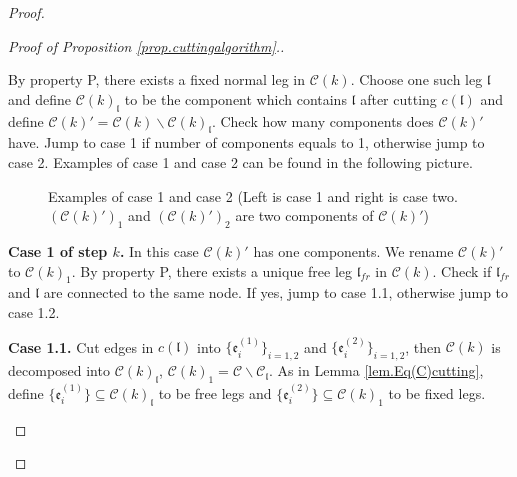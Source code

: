 \begin{proof}
\begin{proof}[Proof of Proposition \ref{prop.cuttingalgorithm}.]
\begin{mdframed}
By property P, there exists a fixed normal leg in $\mathcal{C}(k)$. Choose one such leg $\mathfrak{l}$ and define $\mathcal{C}(k)_{\mathfrak{l}}$ to be the component which contains $\mathfrak{l}$ after cutting $c(\mathfrak{l})$ and define $\mathcal{C}(k)'=\mathcal{C}(k)\backslash \mathcal{C}(k)_{\mathfrak{l}}$. Check how many components does $\mathcal{C}(k)'$ have. Jump to case 1 if number of components equals to 1, otherwise jump to case 2. Examples of case 1 and case 2 can be found in the following picture.
\begin{figure}[H]
    \centering
        \caption{Examples of case 1 and case 2 (Left is case 1 and right is case two. $(\mathcal{C}(k)')_1$ and $(\mathcal{C}(k)')_2$ are two components of $\mathcal{C}(k)'$)}
        \label{fig.step1case}
    \end{figure}

\textbf{Case 1 of step $k$.} In this case $\mathcal{C}(k)'$ has one components. We rename  $\mathcal{C}(k)'$ to $\mathcal{C}(k)_1$. By property P, there exists a unique free leg $\mathfrak{l}_{fr}$ in $\mathcal{C}(k)$. Check if $\mathfrak{l}_{fr}$ and $\mathfrak{l}$ are connected to the same node. If yes, jump to case 1.1, otherwise jump to case 1.2.

\textbf{Case 1.1.} Cut edges in $c(\mathfrak{l})$ into $\{\mathfrak{e}_{i}^{(1)}\}_{i=1,2}$ and $\{\mathfrak{e}_{i}^{(2)}\}_{i=1,2}$, then $\mathcal{C}(k)$ is decomposed into $\mathcal{C}(k)_{\mathfrak{l}}$, $\mathcal{C}(k)_1=\mathcal{C}\backslash \mathcal{C}_{\mathfrak{l}}$. As in Lemma \ref{lem.Eq(C)cutting}, define $\{\mathfrak{e}_{i}^{(1)}\}\subseteq \mathcal{C}(k)_{\mathfrak{l}}$ to be free legs and $\{\mathfrak{e}_{i}^{(2)}\}\subseteq \mathcal{C}(k)_1$ to be fixed legs. 


\end{mdframed}
\end{proof}
\end{proof}
